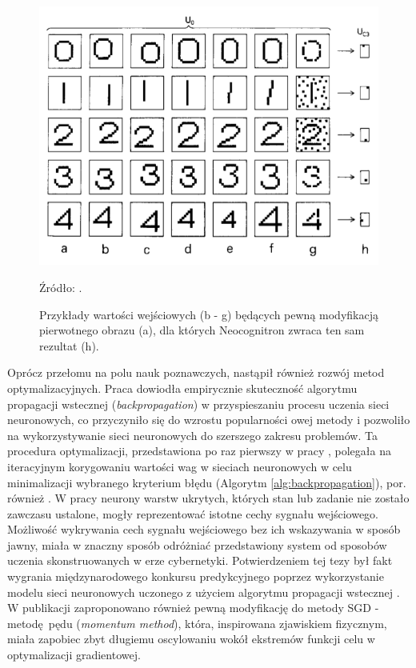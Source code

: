 \documentclass[12pt,a4paper,twoside]{article}
\newcommand{\source}[1]{\caption*{\hfill Źródło: {#1}} }
\begin{document}
\begin{figure}[h]
  \centering
\includegraphics[scale=0.5]{../obrazy/fig:distortion.png}
\caption{Przykłady wartości wejściowych (b - g) będących pewną modyfikacją pierwotnego obrazu (a), dla których Neocognitron zwraca ten sam rezultat (h).\label{fig:distortion}}
\source{\citet{fukushima1980}.}
\end{figure}

Oprócz przełomu na polu nauk poznawczych, nastąpił również rozwój metod optymalizacyjnych. Praca \citet{rumelhart1986} dowiodła empirycznie skuteczność algorytmu propagacji wstecznej (\textit{backpropagation}) w przyspieszaniu procesu uczenia sieci neuronowych, co przyczyniło się do wzrostu popularności owej metody i pozwoliło na wykorzystywanie sieci neuronowych do szerszego zakresu problemów. Ta procedura optymalizacji, przedstawiona po raz pierwszy w pracy \citet{linnainmaa1970}, polegała na iteracyjnym korygowaniu wartości wag w sieciach neuronowych w celu minimalizacji wybranego kryterium błędu (Algorytm \ref{alg:backpropagation}), por. również \citet{hecht1988}. W pracy \citet{rumelhart1986} neurony warstw ukrytych, których stan lub zadanie nie zostało zawczasu ustalone, mogły reprezentować istotne cechy sygnału wejściowego. Możliwość wykrywania cech sygnału wejściowego bez ich wskazywania w sposób jawny, miała w znaczny sposób odróżniać przedstawiony system od sposobów uczenia skonstruowanych w erze cybernetyki. Potwierdzeniem tej tezy był fakt wygrania międzynarodowego konkursu predykcyjnego poprzez wykorzystanie modelu sieci neuronowych uczonego z użyciem algorytmu propagacji wstecznej \citep{wan1993}. W publikacji \citet{rumelhart1986} zaproponowano również pewną modyfikację do metody SGD - metodę pędu (\textit{momentum method}), która, inspirowana zjawiskiem fizycznym, miała zapobiec zbyt długiemu oscylowaniu wokół ekstremów funkcji celu w optymalizacji gradientowej.
\end{document}
